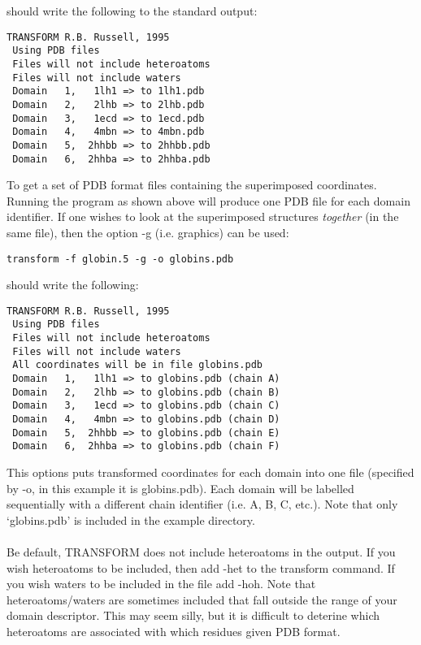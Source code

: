 should write the following to the standard output:\\

\begin{scriptsize}\begin{verbatim}
TRANSFORM R.B. Russell, 1995
 Using PDB files
 Files will not include heteroatoms
 Files will not include waters
 Domain   1,   1lh1 => to 1lh1.pdb
 Domain   2,   2lhb => to 2lhb.pdb
 Domain   3,   1ecd => to 1ecd.pdb
 Domain   4,   4mbn => to 4mbn.pdb
 Domain   5,  2hhbb => to 2hhbb.pdb
 Domain   6,  2hhba => to 2hhba.pdb
\end{verbatim} \end{scriptsize}

To get a set of PDB format files containing the superimposed
coordinates.  Running the program as shown above will produce one PDB 
file for each domain identifier.  If one wishes to look at the 
superimposed structures {\em together} (in the same file), then the 
option -g (i.e. graphics) can be used:\\

\begin{scriptsize}\begin{verbatim}
transform -f globin.5 -g -o globins.pdb
\end{verbatim} \end{scriptsize}

should write the following:\\

\begin{scriptsize}\begin{verbatim}
TRANSFORM R.B. Russell, 1995
 Using PDB files
 Files will not include heteroatoms
 Files will not include waters
 All coordinates will be in file globins.pdb
 Domain   1,   1lh1 => to globins.pdb (chain A)
 Domain   2,   2lhb => to globins.pdb (chain B)
 Domain   3,   1ecd => to globins.pdb (chain C)
 Domain   4,   4mbn => to globins.pdb (chain D)
 Domain   5,  2hhbb => to globins.pdb (chain E)
 Domain   6,  2hhba => to globins.pdb (chain F)
\end{verbatim} \end{scriptsize}

This options puts transformed coordinates for each domain into one file
(specified by -o, in this example it is globins.pdb).  Each domain will 
be labelled sequentially with a different chain identifier (i.e. A, B, C,
etc.).  Note that only `globins.pdb' is included in the example directory.\\
\\
Be default, TRANSFORM does not include heteroatoms in the output.  If you 
wish heteroatoms to be included, then add -het to the transform command.  
If you wish waters to be included in the file add -hoh.
Note that heteroatoms/waters are sometimes included that fall outside the
range of your domain descriptor.  This may seem silly, but it
is difficult to deterine which heteroatoms are associated with which residues
given PDB format.

